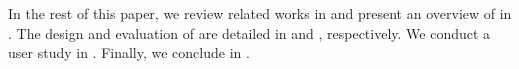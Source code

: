 In the rest of this paper, we review related works in  and present an overview of \sysname in .
The design and evaluation of \sysname are detailed in  and , respectively. We conduct a user study in .
Finally, we conclude in .

